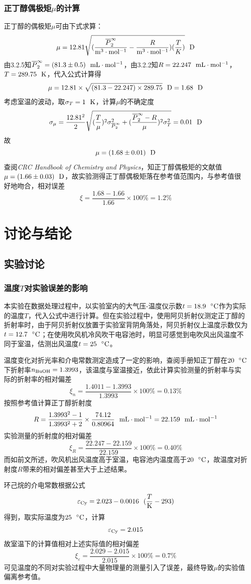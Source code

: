 \documentclass[12pt]{article}
\begin{document}
\subsubsection{正丁醇偶极矩$\mu$的计算}
正丁醇的偶极矩$\mu$可由下式求算：
$$
\mu=12.81\sqrt{(\frac{\overline{P}^{\infty}_{2}}{\rm m^{3}\cdot mol^{-1}}-\frac{R}{\rm m^{3}\cdot mol^{-1}})(\frac{T}{K})}\ \ {\rm D}
$$
由3.2.5知$\overline{P}^{\infty}_{2}=(81.3\pm 0.5) \ \ {\rm mL\cdot mol^{-1}}$，由3.2.2知$R=22.247\ \ {\rm mL\cdot mol^{-1}}$，$T=289.75\ \ {\rm K}$，代入公式计算得
$$
\mu=12.81\times \sqrt{(81.3-22.247)\times 289.75}\ \ {\rm D} = 1.68\ \ {\rm D}
$$
考虑室温的波动，取$\sigma_{T}=1\ \ {\rm K}$，计算$\mu$的不确定度
$$
\sigma_{\mu}=\frac{12.81^{2}}{2} \sqrt{(\frac{T}{\mu})^{2} \sigma_{\overline{P}^{\infty}_{2}}^{2}+(\frac{\overline{P}^{\infty}_{2}-R}{\mu})^{2} \sigma_{T}^{2}}=0.01\ \ {\rm D}
$$
故
$$
\mu=(1.68\pm 0.01)\ \ {\rm D}
$$
查阅\textit{CRC Handbook of Chemistry and Physics}\citealp{crc}，知正丁醇偶极矩的文献值$\mu=(1.66\pm 0.03)\ \ {\rm D}$，故实验测得正丁醇偶极矩落在参考值范围内，与参考值很好地吻合，相对误差
$$
\xi=\frac{1.68-1.66}{1.66}\times 100\%=1.2\%
$$


\vbox{}

 	\section{讨论与结论}
		\subsection{实验讨论}
 			\subsubsection{温度$T$对实验误差的影响}
 			本实验在数据处理过程中，以实验室内的大气压-温度仪示数$t=18.9\ \ {\rm ^{\circ}C}$作为实际的温度$T$，代入公式中进行计算。但在实验过程中，使用阿贝折射仪测定正丁醇的折射率时，由于阿贝折射仪放置于实验室背阴角落处，阿贝折射仪上温度示数仅为$t=12.7\ \ {\rm ^{\circ}C}$；在使用吹风机冷风吹干电容池时，明显可感觉到电吹风出风温度不同于室温，估测出风温度$t=25\ \ {\rm ^{\circ}C} $。\par 
 		温度变化对折光率和介电常数测定造成了一定的影响，查阅手册知正丁醇在$20\ \ {\rm ^{\circ}C}$下折射率$n_{\rm BuOH}=1.3993$，该温度与室温接近，依此计算实验测量的折射率与实际的折射率的相对偏差
 		$$
 		\xi_{n}=\frac{1.4011-1.3993}{1.3993}\times 100\%=0.13\%
 		$$
 		按照参考值计算正丁醇折射度
 		$$R=\frac{1.3993^{2}-1}{1.3993^{2}+2}\times \frac{74.12}{0.80964} \ \ {\rm mL\cdot mol^{-1}}=22.159\ \ {\rm mL\cdot mol^{-1}}$$
 		实验测量的折射度的相对偏差
 		$$\xi_{R}=\frac{22.247-22.159}{22.159}\times 100\%=0.40\%$$
 		而如前文所述，吹风机出风温度高于室温，电容池内温度高于$20\ \ {\rm ^{\circ}C}$，故温度对折射度$R$带来的相对偏差甚至大于上述结果。\par 
 		环己烷的介电常数根据公式
 		$$
 		\varepsilon_{\rm Cy}=2.023-0.0016\ \ (\frac{T}{\rm K}-293)
 		$$
 		得到，取实际温度为$25\ \ {\rm ^{\circ}C}$，计算
 		$$
 		\varepsilon_{\rm Cy}=2.015
 		$$
 		故室温下的计算值相对上述实际值的相对偏差
 		$$
 		\xi_{\varepsilon}=\frac{2.029-2.015}{2.015}\times 100\%=0.7\%
 		$$
 		可见温度的不同对实验过程中大量物理量的测量引入了误差，最终导致$\mu$的实验值偏离参考值。
\end{document}
